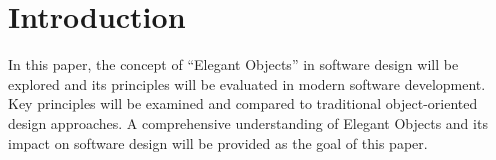 \section{Introduction}\label{sec:introduction}
In this paper, the concept of ``Elegant Objects'' in software design will be explored and its principles will be evaluated in modern software development.
Key principles will be examined and compared to traditional object-oriented design approaches.
A comprehensive understanding of Elegant Objects and its impact on software design will be provided as the goal of this paper.